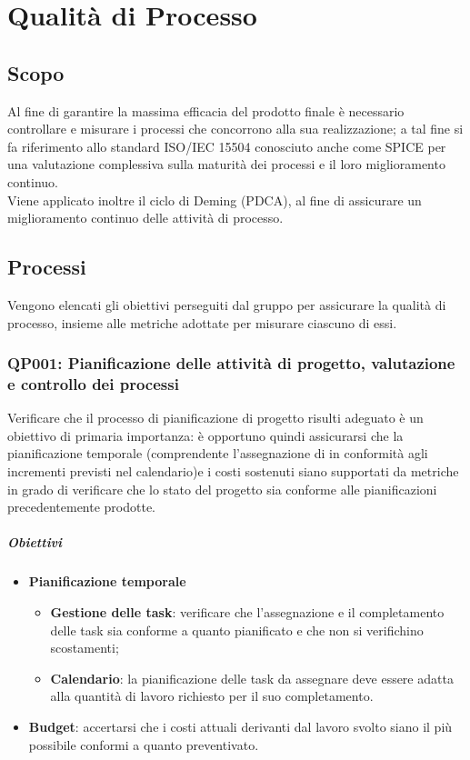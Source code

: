 \chapter{Qualità di Processo}
\label{processo} 
\section{Scopo}
Al fine di garantire la massima efficacia del prodotto finale è necessario controllare e misurare i processi che concorrono alla sua realizzazione; a tal fine si fa riferimento allo standard ISO/IEC 15504 conosciuto anche come SPICE per una valutazione complessiva sulla maturità dei processi e il loro miglioramento continuo.\\
Viene applicato inoltre il ciclo di Deming (PDCA), al fine di assicurare un miglioramento continuo delle attività di processo. 

\section{Processi}
Vengono elencati gli obiettivi perseguiti dal gruppo per assicurare la qualità di processo, insieme alle metriche adottate per misurare ciascuno di essi.
\subsection{QP001: Pianificazione delle attività di progetto, valutazione e controllo dei processi}
Verificare che il processo di pianificazione di progetto risulti adeguato è un obiettivo di primaria importanza: è opportuno quindi assicurarsi che la pianificazione temporale (comprendente l'assegnazione di  in conformità agli incrementi previsti nel calendario)e i costi sostenuti siano supportati da metriche in grado di verificare che lo stato del progetto sia conforme alle pianificazioni precedentemente prodotte.


\paragraph{Obiettivi}
\begin{itemize}
	\item \textbf{Pianificazione temporale}
		\begin{itemize}
			\item \textbf{Gestione delle task}: verificare che l'assegnazione e il completamento delle task sia conforme a quanto pianificato e che non si verifichino scostamenti;
			\item \textbf{Calendario}: la pianificazione delle task da assegnare deve essere adatta alla quantità di lavoro richiesto per il suo completamento.
		\end{itemize}
	\item \textbf{Budget}: accertarsi che i costi attuali derivanti dal lavoro svolto siano il più possibile conformi a quanto preventivato.
\end{itemize}

